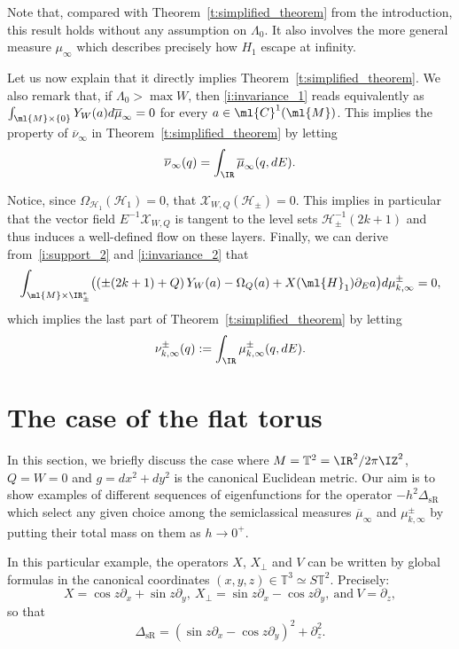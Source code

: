 \documentclass[JEP,XML,SOM,Unicode, NoEqCountersInSection,published]{cedram}
\theoremstyle{plain}
\theoremstyle{definition}
\theoremstyle{remark}
\begin{document}
Note that, compared with Theorem~\ref{t:simplified_theorem} from the introduction, this result holds without any assumption on $\Lambda_0$. It also involves the more general measure $\mu_\infty$ which describes precisely how $H_1$ escape at infinity.

Let us now explain that it directly implies Theorem~\ref{t:simplified_theorem}. We also remark that, if $\Lambda_0>\max W$, then \eqref{i:invariance_1} reads equivalently as
$\int_{\ml{M}\times\{0\}} Y_W(a) d\overline{ \mu}_\infty = 0$ for every $a\in\ml{C}^1(\ml{M})$. This implies the property of $\overline{\nu}_\infty$ in Theorem~\ref{t:simplified_theorem} by letting
\[
\overline{\nu}_\infty(q) = \int_\IR \overline{\mu}_\infty(q,dE).
\]

Notice, since $\Omega_{\mathcal{H}_1}(\mathcal{H}_1) = 0$, that $\mathcal{X}_{W,Q}(\mathcal{H}_\pm) = 0$. This implies in particular that the vector field $E^{-1}\mathcal{X}_{W,Q}$ is tangent to the level sets $\mathcal{H}_\pm^{-1}(2k+1)$ and thus induces a well-defined flow on these layers. Finally, we can derive from~\eqref{i:support_2} and \eqref{i:invariance_2} that
\[
\int_{\ml{M}\times\IR^*_{\pm}}\bigl(\left(\pm(2k+1)+Q\right)Y_W(a)-\Omega_Q(a)+X(\ml{H}_1)\partial_Ea \bigr) d\mu^\pm_{k,\infty} = 0,
\]
which implies the last part of Theorem~\ref{t:simplified_theorem} by letting
\[
\nu_{k,\infty}^\pm(q) := \int_\IR \mu_{k,\infty}^\pm(q,dE).
\]

\section{The case of the flat torus}\label{s:torus}

In this section, we briefly discuss the case where $M= \mathbb{T}^2 = \IR^2/2\pi\IZ^2$, $Q=W=0$ and $g=dx^2+dy^2$ is the canonical Euclidean metric. Our aim is to show examples of different sequences of eigenfunctions for the operator $-h^2 \Delta_{\operatorname{sR}}$ which select any given choice among the semiclassical measures $\overline{\mu}_\infty$ and $\mu_{k,\infty}^{\pm}$ by putting their total mass on them as $h \to 0^+$.

In this particular example, the operators $X$, $X_\perp$ and $V$ can be written by global formulas in the canonical coordinates $(x,y,z) \in \mathbb{T}^3 \simeq S\mathbb{T}^2$. Precisely:
\[
X=\cos z\partial_x+\sin z \partial_y,\ X_\perp=\sin z\partial_x-\cos z\partial_y,\ \text{and}\ V=\partial_z,
\]
so that
\[
\Delta_{\text{sR}}=\left(\sin z\partial_x-\cos z\partial_y\right)^2+\partial_z^2.
\]
\end{document}
